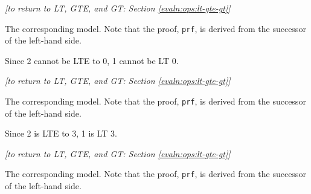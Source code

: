     \begin{flushright}
        \textit{[to return to LT, GTE, and GT: Section \ref{evaln:ops:lt-gte-gt}]}
    \end{flushright}
    
    \newpage
    
    
    
    The corresponding \Idris model. Note that the proof, \texttt{prf}, is derived from the successor of the left-hand side.
    
    
    Since 2 cannot be LTE to 0, 1 cannot be LT 0.
    \\
    
    \begin{flushright}
        \textit{[to return to LT, GTE, and GT: Section \ref{evaln:ops:lt-gte-gt}]}
    \end{flushright}
    
    \newpage
    
    
    
    
    The corresponding \Idris model. Note that the proof, \texttt{prf}, is derived from the successor of the left-hand side.
    
    
    Since 2 is LTE to 3, 1 is LT 3.
    \\
    
    \begin{flushright}
        \textit{[to return to LT, GTE, and GT: Section \ref{evaln:ops:lt-gte-gt}]}
    \end{flushright}
    
    \newpage
    
    
    
    The corresponding \Idris model. Note that the proof, \texttt{prf}, is derived from the successor of the left-hand side.
    
